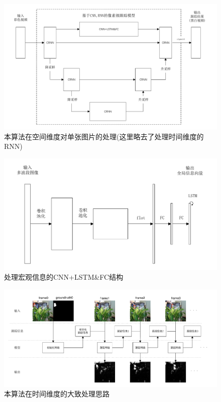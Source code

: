 \par
\begin{figure}
    \centering
    \includegraphics[width = 1.\textwidth]{chap/img/space_process.pdf}
    \caption{本算法在空间维度对单张图片的处理(这里略去了处理时间维度的RNN)}
    \label{fig:space_process}
\end{figure}
\par
\begin{figure}[htbp!]
    \centering
    \includegraphics[width = 1.\textwidth]{chap/img/CNN_FCLSTM.pdf}
    \caption{处理宏观信息的CNN+LSTM\&FC结构}
    \label{fig:CNN_FCLSTM}
\end{figure}
\par
\begin{figure}
    \centering
    \includegraphics[width = 1.\textwidth]{chap/img/time_process.pdf}
    \caption{本算法在时间维度的大致处理思路}
    \label{fig:time_process}
\end{figure}
\par

